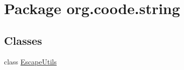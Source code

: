 \hypertarget{namespaceorg_1_1coode_1_1string}{\section{Package org.\-coode.\-string}
\label{namespaceorg_1_1coode_1_1string}
}
\subsection*{Classes}
\begin{DoxyCompactItemize}
\item 
class \hyperlink{classorg_1_1coode_1_1string_1_1_escape_utils}{Escape\-Utils}
\end{DoxyCompactItemize}
